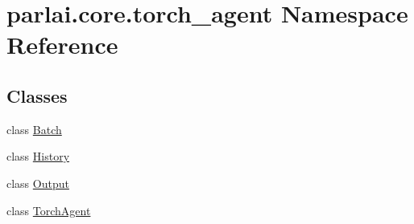 \hypertarget{namespaceparlai_1_1core_1_1torch__agent}{}\section{parlai.\+core.\+torch\+\_\+agent Namespace Reference}
\label{namespaceparlai_1_1core_1_1torch__agent}
\subsection*{Classes}
\begin{DoxyCompactItemize}
\item 
class \hyperlink{classparlai_1_1core_1_1torch__agent_1_1Batch}{Batch}
\item 
class \hyperlink{classparlai_1_1core_1_1torch__agent_1_1History}{History}
\item 
class \hyperlink{classparlai_1_1core_1_1torch__agent_1_1Output}{Output}
\item 
class \hyperlink{classparlai_1_1core_1_1torch__agent_1_1TorchAgent}{Torch\+Agent}
\end{DoxyCompactItemize}
